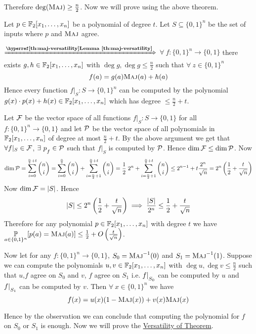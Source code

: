 Therefore $\deg(\textsc{Maj})\geq \frac{n}{2}$. Now we will prove  using the above theorem. \vspace*{2mm}

\begin{proof-of-lemma}
Let $p\in \mathbb{F}_2[x_1,\dots, x_n]$ be a polynomial of degree $t$. Let $S\subseteq \{0,1\}^n$ be the set of inputs where $p$ and $\textsc{Maj}$ agree. \parinf

$\xRightarrow{\textbf{\lmref{maj-versatility}}}$ $\forall\ f:\{0,1\}^n\to \{0,1\}$ there exists $g,h\in\mathbb{F}_2[x_1,\dots, x_n]$ with $\deg g, \deg g\leq \frac{n}2$ such that $\forall \  z\in\{0,1\}^n$ $$f(a)=g(a)\textsc{Maj}(a)+h(a)$$Hence every function $f|_S:S\to \{0,1\}^n$ can be computed by the polynomial $g(x)\cdot p(x)+h(x)\in \mathbb{F}_2[x_1,\dots, x_n]$ which has degree $\leq \frac{n}{2}+t$. \parinn

Let $\mathcal{F}$ be the vector space  of all functions $f|_S:S\to \{0,1\}$ for all $f:\{0,1\}^n\to \{0,1\}$ and let $\mathcal{P}$ be the vector space of all polynomials in $\mathbb{F}_2[x_1,\dots, x_n]$ of degree at most $\frac{n}{2}+t$. By the above argument we get that $\forall f|_S\in \mathcal{F}$, $\exists \ p\strut_f\in \mathcal{P}$ such that $f|_S$ is computed by $\mathcal{P}$. Hence $\dim\mathcal{F}\leq \dim\mathcal{P}$. Now $$\dim \mathcal{P}=\sum_{i=0}^{\frac{n}2+t}\binom{n}{i}=\sum_{i=0}^{\frac{n}2}\binom{n}{i}+\sum_{i=\frac{n}2+1}^{\frac{n}2+t}\binom{n}{i}=\frac12\; 2^n+\sum_{i=\frac{n}2+1}^{\frac{n}2+t}\binom{n}{i}\leq 2^{n-1}+t\frac{2^n}{\sqrt{n}}=2^n\left(\frac12+\frac{t}{\sqrt{n}}\right)$$Now $\dim \mathcal{F}=|S|$. Hence $$|S|\leq 2^n\left(\frac12+\frac{t}{\sqrt{n}}\right)\implies \frac{|S|}{2^n}\leq \frac12+\frac{t}{\sqrt{n}}$$Therefore for any polynomial $p\in \mathbb{F}_2[x_1,\dots, x_n]$ with degree $t$ we have $\underset{a\in\{0,1\}^n}{\mathbb{P}}[p(a)=\textsc{Maj}(a)]\leq \frac12+O\left(\frac{t}{\sqrt{n}}\right)$.
\end{proof-of-lemma}


\begin{observation*}
	Now let for any $f:\{0,1\}^n\to \{0,1\}$, $S_0=\textsc{Maj}^{-1}(0)$ and $S_1=\textsc{Maj}^{-1}(1)$.  Suppose we can compute the polynomials $u,v\in\mathbb{F}_2[x_1,\dots, x_n]$ with $\deg u,\deg v\leq \frac{n}{2}$ such that $u$,$f$ agree on $S_0$ and $v$, $f$ agree on $S_1$ i.e. $f|\strut_{S_0}$ can be computed by $u$ and $f|\strut_{S_1}$ can be computed by $v$. Then $\forall \ x\in\{0,1\}^n$ we have $$f(x)=u(x)(1-\textsc{Maj}(x))+v(x)\textsc{Maj}(x)$$
\end{observation*}
Hence by the observation we can conclude that computing the polynomial for $f$ on $S_0$ or $S_1$ is enough. Now we will prove the \hyperref[th:maj-versatility]{Versatility of  Theorem}. \vspace*{2mm}

